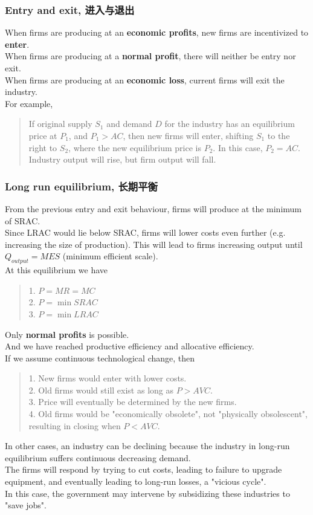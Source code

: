 \subsubsection{Entry and exit, 进入与退出}
When firms are producing at an \textbf{economic profits}, new firms are incentivized to \textbf{enter}. \\
When firms are producing at a \textbf{normal profit}, there will neither be entry nor exit. \\
When firms are producing at an \textbf{economic loss}, current firms will exit the industry. \\
For example,
\begin{quote}
    If original supply $S_1$ and demand $D$ for the industry has an equilibrium price at $P_1$, and $P_1 > AC$, then new firms will enter, shifting $S_1$ to the right to $S_2$, where the new equilibrium price is $P_2$. In this case, $P_2 = AC$. \\
    Industry output will rise, but firm output will fall.
\end{quote}
\subsubsection{Long run equilibrium, 长期平衡}
From the previous entry and exit behaviour, firms will produce at the minimum of SRAC. \\
Since LRAC would lie below SRAC, firms will lower costs even further (e.g. increasing the size of production). This will lead to firms increasing output until $Q_{output} = MES$ (minimum efficient scale). \\
At this equilibrium we have
\begin{quote}
    1. $P = MR = MC$ \\
    2. $P = \min{SRAC}$ \\
    3. $P = \min{LRAC}$
\end{quote}
Only \textbf{normal profits} is possible. \\
And we have reached productive efficiency and allocative efficiency. \\
If we assume continuous technological change, then
\begin{quote}
    1. New firms would enter with lower costs. \\
    2. Old firms would still exist as long as $P > AVC$. \\
    3. Price will eventually be determined by the new firms. \\
    4. Old firms would be "economically obsolete", not "physically obsolescent", resulting in closing when $P < AVC$.
\end{quote}
In other cases, an industry can be declining because the industry in long-run equilibrium suffers continuous decreasing demand. \\
The firms will respond by trying to cut costs, leading to failure to upgrade equipment, and eventually leading to long-run losses, a "vicious cycle". \\
In this case, the government may intervene by subsidizing these industries to "save jobs".

\newpage